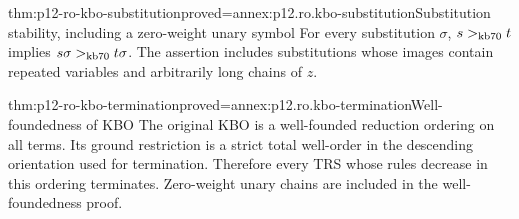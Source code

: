 \begin{hblemma}{thm:p12-ro-kbo-substitution}{proved=annex:p12.ro.kbo-substitution}{Substitution stability, including a zero-weight unary symbol}
For every substitution \(\sigma\),
\(s>_{\rm kb70}t\) implies \(s\sigma>_{\rm kb70}t\sigma\).
The assertion includes substitutions whose images contain repeated
variables and arbitrarily long chains of \(z\).
\end{hblemma}

\begin{hbtheorem}{thm:p12-ro-kbo-termination}{proved=annex:p12.ro.kbo-termination}{Well-foundedness of KBO}
The original KBO is a well-founded reduction ordering on all terms.
Its ground restriction is a strict total well-order in the descending
orientation used for termination. Therefore every TRS whose rules
decrease in this ordering terminates. Zero-weight unary chains are
included in the well-foundedness proof.
\end{hbtheorem}

